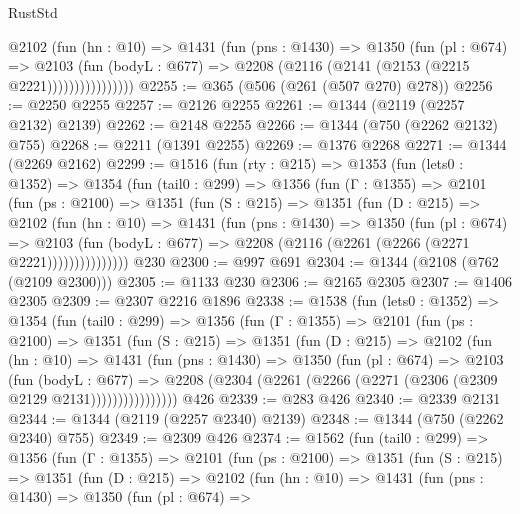 \begin{lexlean}{RustStd}
\begin{coremodule}
                  @2102
                    (fun (hn : @10) =>
                    @1431
                      (fun (pns : @1430) =>
                      @1350
                        (fun (pl : @674) =>
                        @2103
                          (fun (bodyL : @677) =>
                          @2208 (@2116 (@2141 (@2153 (@2215 @2221))))))))))))))))
@2255 := @365 (@506 (@261 (@507 @270) @278))
@2256 := @2250 @2255
@2257 := @2126 @2255
@2261 := @1344 (@2119 (@2257 @2132) @2139)
@2262 := @2148 @2255
@2266 := @1344 (@750 (@2262 @2132) @755)
@2268 := @2211 (@1391 @2255)
@2269 := @1376 @2268
@2271 := @1344 (@2269 @2162)
@2299 := @1516
    (fun (rty : @215) =>
    @1353
      (fun (lets0 : @1352) =>
      @1354
        (fun (tail0 : @299) =>
        @1356
          (fun (Γ : @1355) =>
          @2101
            (fun (ps : @2100) =>
            @1351
              (fun (S : @215) =>
              @1351
                (fun (D : @215) =>
                @2102
                  (fun (hn : @10) =>
                  @1431
                    (fun (pns : @1430) =>
                    @1350
                      (fun (pl : @674) =>
                      @2103
                        (fun (bodyL : @677) =>
                        @2208 (@2116 (@2261 (@2266 (@2271 @2221)))))))))))))))
    @230
@2300 := @997 @691
@2304 := @1344 (@2108 (@762 (@2109 @2300)))
@2305 := @1133 @230
@2306 := @2165 @2305
@2307 := @1406 @2305
@2309 := @2307 @2216 @1896
@2338 := @1538
    (fun (lets0 : @1352) =>
    @1354
      (fun (tail0 : @299) =>
      @1356
        (fun (Γ : @1355) =>
        @2101
          (fun (ps : @2100) =>
          @1351
            (fun (S : @215) =>
            @1351
              (fun (D : @215) =>
              @2102
                (fun (hn : @10) =>
                @1431
                  (fun (pns : @1430) =>
                  @1350
                    (fun (pl : @674) =>
                    @2103
                      (fun (bodyL : @677) =>
                      @2208 (@2304 (@2261 (@2266 (@2271 (@2306 (@2309 @2129 @2131))))))))))))))))
    @426
@2339 := @283 @426
@2340 := @2339 @2131
@2344 := @1344 (@2119 (@2257 @2340) @2139)
@2348 := @1344 (@750 (@2262 @2340) @755)
@2349 := @2309 @426
@2374 := @1562
    (fun (tail0 : @299) =>
    @1356
      (fun (Γ : @1355) =>
      @2101
        (fun (ps : @2100) =>
        @1351
          (fun (S : @215) =>
          @1351
            (fun (D : @215) =>
            @2102
              (fun (hn : @10) =>
              @1431
                (fun (pns : @1430) =>
                @1350
                  (fun (pl : @674) =>

\end{coremodule}
\end{lexlean}
